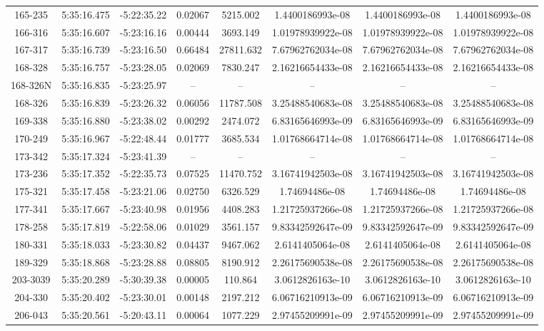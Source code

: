 \begin{table}
\begin{tabular}{cccccccc}
165-235 & 5:35:16.475 & -5:22:35.22 & 0.02067 & 5215.002 & 1.4400186993e-08 & 1.4400186993e-08 & 1.4400186993e-08 \\
166-316 & 5:35:16.607 & -5:23:16.16 & 0.00444 & 3693.149 & 1.01978939922e-08 & 1.01978939922e-08 & 1.01978939922e-08 \\
167-317 & 5:35:16.739 & -5:23:16.50 & 0.66484 & 27811.632 & 7.67962762034e-08 & 7.67962762034e-08 & 7.67962762034e-08 \\
168-328 & 5:35:16.757 & -5:23:28.05 & 0.02069 & 7830.247 & 2.16216654433e-08 & 2.16216654433e-08 & 2.16216654433e-08 \\
168-326N & 5:35:16.835 & -5:23:25.97 & -- & -- & -- & -- & -- \\
168-326 & 5:35:16.839 & -5:23:26.32 & 0.06056 & 11787.508 & 3.25488540683e-08 & 3.25488540683e-08 & 3.25488540683e-08 \\
169-338 & 5:35:16.880 & -5:23:38.02 & 0.00292 & 2474.072 & 6.83165646993e-09 & 6.83165646993e-09 & 6.83165646993e-09 \\
170-249 & 5:35:16.967 & -5:22:48.44 & 0.01777 & 3685.534 & 1.01768664714e-08 & 1.01768664714e-08 & 1.01768664714e-08 \\
173-342 & 5:35:17.324 & -5:23:41.39 & -- & -- & -- & -- & -- \\
173-236 & 5:35:17.352 & -5:22:35.73 & 0.07525 & 11470.752 & 3.16741942503e-08 & 3.16741942503e-08 & 3.16741942503e-08 \\
175-321 & 5:35:17.458 & -5:23:21.06 & 0.02750 & 6326.529 & 1.74694486e-08 & 1.74694486e-08 & 1.74694486e-08 \\
177-341 & 5:35:17.667 & -5:23:40.98 & 0.01956 & 4408.283 & 1.21725937266e-08 & 1.21725937266e-08 & 1.21725937266e-08 \\
178-258 & 5:35:17.819 & -5:22:58.06 & 0.01029 & 3561.157 & 9.83342592647e-09 & 9.83342592647e-09 & 9.83342592647e-09 \\
180-331 & 5:35:18.033 & -5:23:30.82 & 0.04437 & 9467.062 & 2.6141405064e-08 & 2.6141405064e-08 & 2.6141405064e-08 \\
189-329 & 5:35:18.868 & -5:23:28.88 & 0.08805 & 8190.912 & 2.26175690538e-08 & 2.26175690538e-08 & 2.26175690538e-08 \\
203-3039 & 5:35:20.289 & -5:30:39.38 & 0.00005 & 110.864 & 3.0612826163e-10 & 3.0612826163e-10 & 3.0612826163e-10 \\
204-330 & 5:35:20.402 & -5:23:30.01 & 0.00148 & 2197.212 & 6.06716210913e-09 & 6.06716210913e-09 & 6.06716210913e-09 \\
206-043 & 5:35:20.561 & -5:20:43.11 & 0.00064 & 1077.229 & 2.97455209991e-09 & 2.97455209991e-09 & 2.97455209991e-09 \\

\end{tabular}
\end{table}
